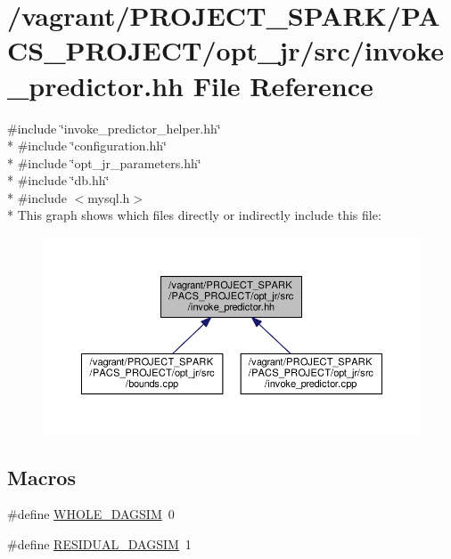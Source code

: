 \hypertarget{invoke__predictor_8hh}{\section{/vagrant/\-P\-R\-O\-J\-E\-C\-T\-\_\-\-S\-P\-A\-R\-K/\-P\-A\-C\-S\-\_\-\-P\-R\-O\-J\-E\-C\-T/opt\-\_\-jr/src/invoke\-\_\-predictor.hh File Reference}
\label{invoke__predictor_8hh}
}
{\ttfamily \#include \char`\"{}invoke\-\_\-predictor\-\_\-helper.\-hh\char`\"{}}\\*
{\ttfamily \#include \char`\"{}configuration.\-hh\char`\"{}}\\*
{\ttfamily \#include \char`\"{}opt\-\_\-jr\-\_\-parameters.\-hh\char`\"{}}\\*
{\ttfamily \#include \char`\"{}db.\-hh\char`\"{}}\\*
{\ttfamily \#include $<$mysql.\-h$>$}\\*
This graph shows which files directly or indirectly include this file\-:
\nopagebreak
\begin{figure}[H]
\begin{center}
\leavevmode
\includegraphics[width=350pt]{invoke__predictor_8hh__dep__incl}
\end{center}
\end{figure}
\subsection*{Macros}
\begin{DoxyCompactItemize}
\item 
\#define \hyperlink{invoke__predictor_8hh_a3806de5f70b6971cfe8be82520f4bf2a}{W\-H\-O\-L\-E\-\_\-\-D\-A\-G\-S\-I\-M}~0
\item 
\#define \hyperlink{invoke__predictor_8hh_a016c9fba38e790ceafd4d9843f2dc564}{R\-E\-S\-I\-D\-U\-A\-L\-\_\-\-D\-A\-G\-S\-I\-M}~1
\end{DoxyCompactItemize}
